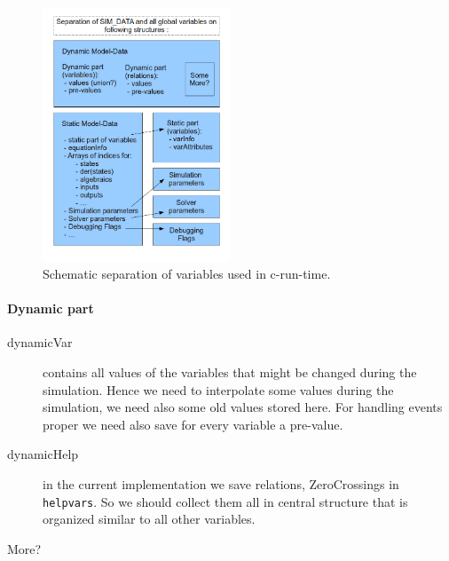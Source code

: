 \begin{figure}[htb]
\begin{center}
  \includegraphics[width=0.5\textwidth]{./img/newSimDATA.png}
  \caption{Schematic separation of variables used in c-run-time.}
  \label{fig:seperatedVariables}
\end{center}
\end{figure}

\paragraph{Dynamic part}
\begin{description}
\item[dynamicVar] contains all values of the variables
that might be changed during the simulation. Hence we need to interpolate some
values during the simulation, we need also some old values stored here. For
handling events proper we need also save for every variable a pre-value.
\item[dynamicHelp] in the current implementation we save relations,
ZeroCrossings in \verb+helpvars+. So we should collect them all in central
structure that is organized similar to all other variables.
\item[More?]
\end{description}

